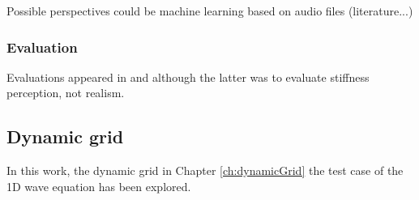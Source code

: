 Possible perspectives could be machine learning based on audio files (literature...)

\subsubsection{Evaluation}
Evaluations appeared in \citeP[E] and \citeP[F] although the latter was to evaluate stiffness perception, not realism. 



\subsection{Dynamic grid}
In this work, the dynamic grid in Chapter \ref{ch:dynamicGrid} the test case of the 1D wave equation has been explored. 